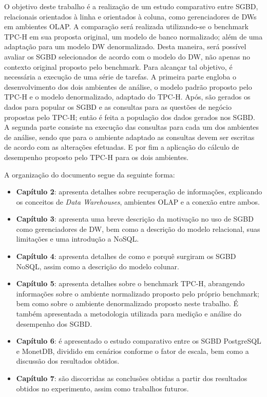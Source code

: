O objetivo deste trabalho é a realização de um estudo comparativo entre SGBD, relacionais orientados à linha e orientados à coluna, 
como gerenciadores de DWs em ambientes OLAP. A comparação será realizada utilizando-se o benchmark TPC-H em sua proposta original, um modelo de banco normalizado; 
além de uma adaptação para um modelo DW denormalizado. Desta maneira, será possível avaliar os SGBD selecionados de acordo com o modelo do DW, não apenas no 
contexto original proposto pelo benchmark. Para alcançar tal objetivo, é necessária a execução de uma série de tarefas. A primeira parte engloba o 
desenvolvimento dos dois ambientes de análise, o modelo padrão proposto pelo TPC-H e o modelo denormalizado, adaptado do TPC-H. Após, são gerados os 
dados para popular os SGBD e as consultas para as questões de negócio propostas pelo TPC-H; então é feita a população dos dados gerados nos SGBD. 
A segunda parte consiste na execução das consultas para cada um dos ambientes de análise, sendo que para o ambiente adaptado as consultas devem 
ser escritas de acordo com as alterações efetuadas. E por fim a aplicação do cálculo de desempenho proposto pelo TPC-H para os dois ambientes. 

A organização do documento segue da seguinte forma:

\begin{itemize}
	\item \textbf{Capítulo 2}: apresenta detalhes sobre recuperação de informações, explicando os conceitos de \textit{Data Warehouses}, 
	ambientes OLAP e a conexão entre ambos.
	\item \textbf{Capítulo 3}: apresenta uma breve descrição da motivação no uso de SGBD como gerenciadores de DW, bem como a descrição 
	do modelo relacional, suas limitações e uma introdução a NoSQL.
	\item \textbf{Capítulo 4}: apresenta detalhes de como e porquê surgiram os SGBD NoSQL, assim como a descrição do modelo colunar.
	\item \textbf{Capítulo 5}: apresenta detalhes sobre o benchmark TPC-H, abrangendo informações sobre o ambiente normalizado proposto pelo próprio benchmark; bem como sobre o ambiente denormalizado proposto neste trabalho. É também apresentada a metodologia utilizada para medição e análise do desempenho dos SGBD.
	\item \textbf{Capítulo 6}: é apresentado o estudo comparativo entre os SGBD PostgreSQL e MonetDB, dividido em cenários conforme o fator 
	de escala, bem como a discussão dos resultados obtidos.
	\item \textbf{Capítulo 7}: são discorridas as conclusões obtidas a partir dos resultados obtidos no experimento, assim como 
	trabalhos futuros.
\end{itemize}


